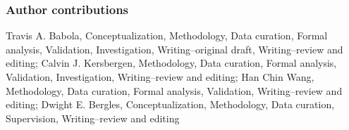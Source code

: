 \documentclass[9pt,lineno]{elife}
\begin{document}
\subsubsection{Author contributions}
Travis A. Babola, Conceptualization, Methodology, Data curation, Formal analysis, Validation, Investigation, Writing--original draft, Writing--review and editing; Calvin J. Kersbergen, Methodology, Data curation, Formal analysis, Validation, Investigation, Writing--review and editing;
Han Chin Wang, Methodology, Data curation, Formal analysis, Validation, Writing--review and editing;
Dwight E. Bergles, Conceptualization, Methodology, Data curation, Supervision, Writing--review and editing


\end{document}
